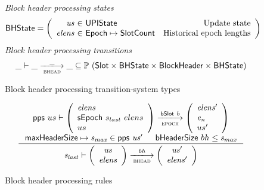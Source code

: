 \documentclass[11pt,a4paper]{article}
\newcommand{\powerset}[1]{\mathbb{P}~#1}
\newcommand{\var}[1]{\mathit{#1}}
\newcommand{\fun}[1]{\mathsf{#1}}
\newcommand{\type}[1]{\mathsf{#1}}
\newcommand{\trans}[2]{\xlongrightarrow[\textsc{#1}]{#2}}
\newcommand{\partialf}{\mapsto}
\newcommand{\Slot}{\type{Slot}}
\newcommand{\SlotCount}{\type{SlotCount}}
\newcommand{\bhdrsizename}{bHeaderSize}
\newcommand{\bhdrsize}[1]{\fun{\bhdrsizename} ~ #1}
\begin{document}
\begin{figure}[ht]

  \emph{Block header processing states}
  \begin{equation*}
    \BHState =
    \left(
      \begin{array}{r@{~\in~}lr}
        \var{us} & \UPIState & \text{Update state} \\
        \var{elens} & \Epoch \partialf \SlotCount & \text{Historical epoch lengths} \\
      \end{array}
    \right)
  \end{equation*}
  \emph{Block header processing transitions}
  \begin{equation*}
    \var{\_} \vdash \var{\_} \trans{bhead}{\_} \var{\_} \subseteq
    \powerset (\Slot \times \BHState \times \Bhead \times \BHState)
  \end{equation*}
  \caption{Block header processing transition-system types}
  \label{fig:ts-types:bhead}
\end{figure}

\begin{figure}[ht]
  \begin{equation*}
    \inference
    { \fun{pps} ~ us \vdash
      {\left(
          \begin{array}{l}
            \var{elens} \\
            \sepoch{s_{last}}{elens} \\
            us
          \end{array}
        \right)}
      \trans{epoch}{\bslot{b}}
      {\left(
          \begin{array}{l}
            \var{elens'} \\
            \var{e_n} \\
            us'
          \end{array}
        \right)}
      \\
      \\ \maxheadersize \mapsto \var{s_{max}} \in \fun{pps}~\var{us'} & \bhdrsize{bh} \leq \var{s_{max}}
    }
    {
      \var{s_{last}} \vdash
      \left(
        {\begin{array}{c}
           \var{us} \\
           \var{elens}
         \end{array}}
     \right)
     \trans{bhead}{\var{bh}}
     \left(
       {\begin{array}{c}
          \var{us'} \\
          \var{elens'}
        \end{array}}
    \right)
  }
\end{equation*}
\caption{Block header processing rules}
\label{fig:rules:bhead}
\end{figure}
\end{document}
